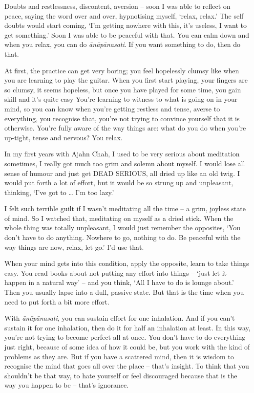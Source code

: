 Doubts and restlessness, discontent, aversion -- soon I was able to reflect on peace, saying the word over and over, hypnotising myself, `relax, relax.' The self doubts would start coming, `I'm getting nowhere with this, it's useless, I want to get something.' Soon I was able to be peaceful with that. You can calm down and when you relax, you can do \textit{ānāpānasati}. If you want something to do, then do that.

At first, the practice can get very boring; you feel hopelessly clumsy like when you are learning to play the guitar. When you first start playing, your fingers are so clumsy, it seems hopeless, but once you have played for some time, you gain skill and it's quite easy You're learning to witness to what is going on in your mind, so you can know when you're getting restless and tense, averse to everything, you recognise that, you're not trying to convince yourself that it is otherwise. You're fully aware of the way things are: what do you do when you're up-tight, tense and nervous? You relax.

In my first years with Ajahn Chah, I used to be very serious about meditation sometimes, I really got much too grim and solemn about myself. I would lose all sense of humour and just get DEAD SERIOUS, all dried up like an old twig. I would put forth a lot of effort, but it would be so strung up and unpleasant, thinking, `I've got to \ldots{} I'm too lazy.'

I felt such terrible guilt if I wasn't meditating all the time -- a grim, joyless state of mind. So I watched that, meditating on myself as a dried stick. When the whole thing was totally unpleasant, I would just remember the opposites, `You don't have to do anything. Nowhere to go, nothing to do. Be peaceful with the way things are now, relax, let go.' I'd use that.

When your mind gets into this condition, apply the opposite, learn to take things easy. You read books about not putting any effort into things -- `just let it happen in a natural way' -- and you think, `All I have to do is lounge about.' Then you usually lapse into a dull, passive state. But that is the time when you need to put forth a bit more effort.

With \textit{ānāpānasati}, you can sustain effort for one inhalation. And if you can't sustain it for one inhalation, then do it for half an inhalation at least. In this way, you're not trying to become perfect all at once. You don't have to do everything just right, because of some idea of how it could be, but you work with the kind of problems as they are. But if you have a scattered mind, then it is wisdom to recognise the mind that goes all over the place -- that's insight. To think that you shouldn't be that way, to hate yourself or feel discouraged because that is the way you happen to be -- that's ignorance.

